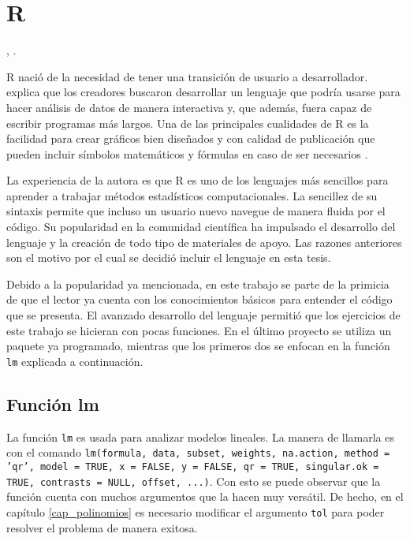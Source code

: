 \chapter{R} \label{cap_R}

, \cite{laberintos_historiaR}. 

\textsf{R} nació de la necesidad de tener una transición de usuario a desarrollador. \cite{peng_programming} explica que los creadores buscaron desarrollar un lenguaje que podría usarse para hacer análisis de datos de manera interactiva y, que además, fuera capaz de escribir programas más largos. Una de las principales cualidades de \textsf{R} es la facilidad para crear gráficos bien diseñados y con calidad de publicación que pueden incluir símbolos matemáticos y fórmulas en caso de ser necesarios \citep{pagina_r}. 

La experiencia de la autora es que \textsf{R} es uno de los lenguajes más sencillos para aprender a trabajar métodos estadísticos computacionales. La sencillez de su sintaxis permite que incluso un usuario nuevo navegue de manera fluida por el código. Su popularidad en la comunidad científica ha impulsado el desarrollo del lenguaje y la creación de todo tipo de materiales de apoyo. Las razones anteriores son el motivo por el cual se decidió incluir el lenguaje en esta tesis. 

Debido a la popularidad ya mencionada, en este trabajo se parte de la primicia de que el lector ya cuenta con los conocimientos básicos para entender el código que se presenta. El avanzado desarrollo del lenguaje permitió que los ejercicios de este trabajo se hicieran con pocas funciones. En el último proyecto se utiliza un paquete ya programado, mientras que los primeros dos se enfocan en la función \texttt{lm} explicada a continuación. 

\section{Función lm} \label{explicacion_lm}

La función \texttt{lm} es usada para analizar modelos lineales. La manera de llamarla es con el comando \texttt{lm(formula, data, subset, weights, na.action, method = 'qr', model = TRUE, x = FALSE, y = FALSE, qr = TRUE, singular.ok = TRUE, contrasts = NULL, offset, ...)}. Con esto se puede observar que la función cuenta con muchos argumentos que la hacen muy versátil. De hecho, en el capítulo \ref{cap_polinomios} es necesario modificar el argumento \texttt{tol} para poder resolver el problema de manera exitosa. 

